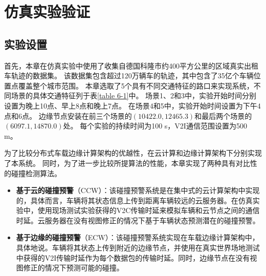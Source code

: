 \section{仿真实验验证}\label{section 6-4}

\subsection{实验设置}

首先，本章在仿真实验中使用了收集自德国科隆市约400平方公里的区域真实出租车轨迹的数据集\cite{uppoor2013generation}。
该数据集包含超过120万辆车的轨迹，其中包含了35亿个车辆位置点覆盖整个城市范围。
本章选取了5个具有不同交通特征的路口来实现系统，不同场景的具体交通特征列于表\ref{table 6-1}中。
场景1、2和3中，实验开始时间分别设置为晚上10点、早上8点和晚上7点。
在场景4和5中，实验开始时间设置为下午4点和6点。
边缘节点安装在前三个场景的$(10422.0, 12465.3)$和最后两个场景的$(6097.1, 14870.0)$处。
每个实验的持续时间为100 s，V2I通信范围设置为500 m。

\begin{table}[h]\small
\centering
{}
\label{table 6-1}
\end{table}

为了比较分布式车载边缘计算架构的优越性，在云计算和边缘计算架构下分别实现了本系统。
同时，为了进一步比较所提算法的性能，本章实现了两种具有对比性的碰撞检测算法。
\begin{itemize}
	\item \textbf{基于云的碰撞预警}（CCW）：该碰撞预警系统是在集中式的云计算架构中实现的，具体而言，车辆将其状态信息上传到距离车辆较远的云服务器。在仿真实验中，使用现场测试实验获得的V2C传输时延来模拟车辆和云节点之间的通信时延。云服务器在没有视图修正的情况下基于车辆状态预测潜在的碰撞预警。
	\item \textbf{基于边缘的碰撞预警}（ECW）：该碰撞预警系统实现在车载边缘计算架构中，具体地说。车辆将其状态上传到附近的边缘节点，并使用在真实世界场地测试中获得的V2I传输时延作为每个数据包的传输时延。同时，边缘节点在没有视图修正的情况下预测可能的碰撞。
\end{itemize}

